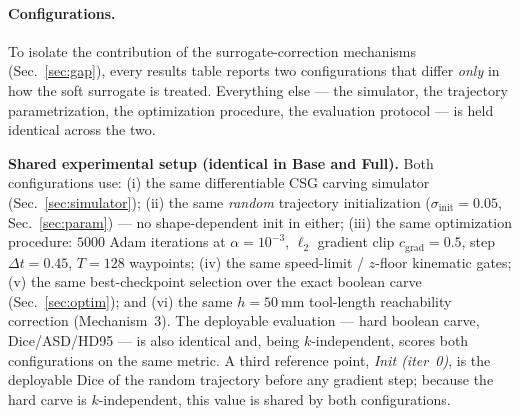 \paragraph{Configurations.}
To isolate the contribution of the surrogate-correction mechanisms
(Sec.~\ref{sec:gap}), every results table reports two configurations that differ
\emph{only} in how the soft surrogate is treated. Everything else --- the
simulator, the trajectory parametrization, the optimization procedure, the
evaluation protocol --- is held identical across the two.

\textbf{Shared experimental setup (identical in Base and Full).} Both
configurations use: (i) the same differentiable CSG carving simulator
(Sec.~\ref{sec:simulator}); (ii) the same \emph{random} trajectory
initialization ($\sigma_{\mathrm{init}}{=}0.05$, Sec.~\ref{sec:param}) --- no
shape-dependent init in either; (iii) the same optimization procedure: $5000$
Adam iterations at $\alpha{=}10^{-3}$, $\ell_2$ gradient clip
$c_{\mathrm{grad}}{=}0.5$, step $\Delta t{=}0.45$, $T{=}128$ waypoints; (iv) the
same speed-limit / $z$-floor kinematic gates; (v) the same best-checkpoint
selection over the exact boolean carve (Sec.~\ref{sec:optim}); and (vi) the same
$h{=}50~\mathrm{mm}$ tool-length reachability correction (Mechanism~3). The
deployable evaluation --- hard boolean carve, Dice/ASD/HD95 --- is also identical
and, being $k$-independent, scores both configurations on the same metric. A
third reference point, \emph{Init (iter~0)}, is the deployable Dice of the random
trajectory before any gradient step; because the hard carve is $k$-independent,
this value is shared by both configurations.

